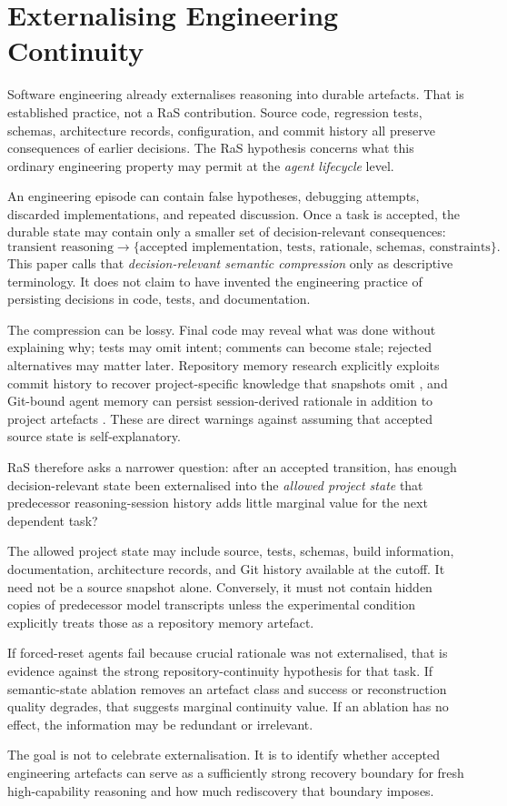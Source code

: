 \section{Externalising Engineering Continuity}
\label{sec:externalising}

Software engineering already externalises reasoning into durable artefacts. That is established practice, not a RaS contribution. Source code, regression tests, schemas, architecture records, configuration, and commit history all preserve consequences of earlier decisions. The RaS hypothesis concerns what this ordinary engineering property may permit at the \emph{agent lifecycle} level.

An engineering episode can contain false hypotheses, debugging attempts, discarded implementations, and repeated discussion. Once a task is accepted, the durable state may contain only a smaller set of decision-relevant consequences:
\[
\text{transient reasoning}
\rightarrow
\{\text{accepted implementation, tests, rationale, schemas, constraints}\}.
\]
This paper calls that \emph{decision-relevant semantic compression} only as descriptive terminology. It does not claim to have invented the engineering practice of persisting decisions in code, tests, and documentation.

The compression can be lossy. Final code may reveal what was done without explaining why; tests may omit intent; comments can become stale; rejected alternatives may matter later. Repository memory research explicitly exploits commit history to recover project-specific knowledge that snapshots omit \citep{wang2025repomemory,li2026learningcommit}, and Git-bound agent memory can persist session-derived rationale in addition to project artefacts \citep{guo2026gitmemory}. These are direct warnings against assuming that accepted source state is self-explanatory.

RaS therefore asks a narrower question: after an accepted transition, has enough decision-relevant state been externalised into the \emph{allowed project state} that predecessor reasoning-session history adds little marginal value for the next dependent task?

The allowed project state may include source, tests, schemas, build information, documentation, architecture records, and Git history available at the cutoff. It need not be a source snapshot alone. Conversely, it must not contain hidden copies of predecessor model transcripts unless the experimental condition explicitly treats those as a repository memory artefact.

If forced-reset agents fail because crucial rationale was not externalised, that is evidence against the strong repository-continuity hypothesis for that task. If semantic-state ablation removes an artefact class and success or reconstruction quality degrades, that suggests marginal continuity value. If an ablation has no effect, the information may be redundant or irrelevant.

The goal is not to celebrate externalisation. It is to identify whether accepted engineering artefacts can serve as a sufficiently strong recovery boundary for fresh high-capability reasoning and how much rediscovery that boundary imposes.
